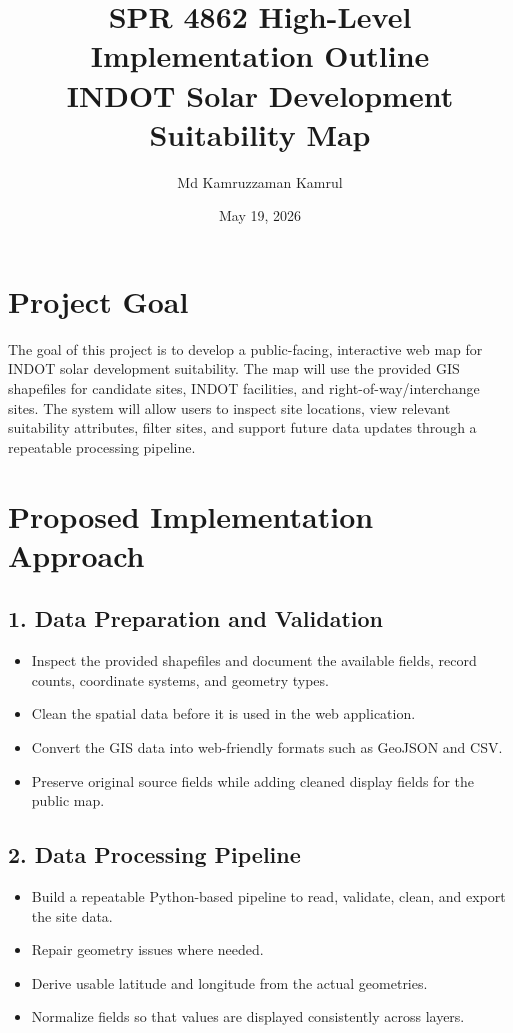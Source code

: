 \documentclass[10pt]{article}
\title{\vspace{-2.0em}\textbf{SPR 4862 High-Level Implementation Outline}\\
\large INDOT Solar Development Suitability Map}
\author{Md Kamruzzaman Kamrul}
\date{May 19, 2026}
\begin{document}
\maketitle
\vspace{-1.2em}

\section{Project Goal}

The goal of this project is to develop a public-facing, interactive web map for
INDOT solar development suitability. The map will use the provided GIS shapefiles
for candidate sites, INDOT facilities, and right-of-way/interchange sites. The
system will allow users to inspect site locations, view relevant suitability
attributes, filter sites, and support future data updates through a repeatable
processing pipeline.

\section{Proposed Implementation Approach}

\subsection{1. Data Preparation and Validation}
\begin{itemize}
  \item Inspect the provided shapefiles and document the available fields, record counts, coordinate systems, and geometry types.
  \item Clean the spatial data before it is used in the web application.
  \item Convert the GIS data into web-friendly formats such as GeoJSON and CSV.
  \item Preserve original source fields while adding cleaned display fields for the public map.
\end{itemize}

\subsection{2. Data Processing Pipeline}
\begin{itemize}
  \item Build a repeatable Python-based pipeline to read, validate, clean, and export the site data.
  \item Repair geometry issues where needed.
  \item Derive usable latitude and longitude from the actual geometries.
  \item Normalize fields so that values are displayed consistently across layers.
\end{itemize}
\end{document}
